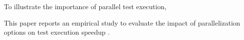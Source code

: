 \Fix{--------------}

To illustrate the importance of parallel test execution, 

This paper reports an empirical study to evaluate the impact of
parallelization options on test execution speedup  .


 	
